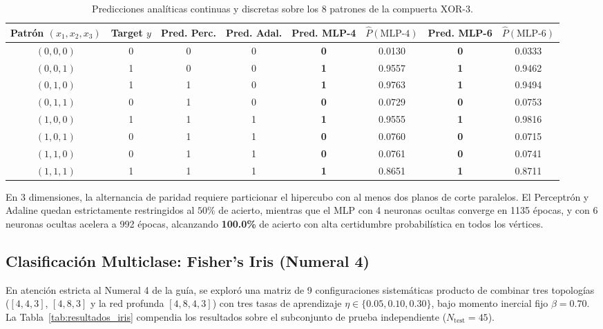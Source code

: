 \documentclass[11pt,letterpaper]{article}
\begin{document}
\begin{table}[htbp]
\centering
\small
\caption{Predicciones analíticas continuas y discretas sobre los 8 patrones de la compuerta $\text{XOR-3}$.}
\label{tab:pred_xor3}
\begin{adjustbox}{max width=\textwidth}
\begin{tabular}{c c c c c c c c}
\toprule
\textbf{Patrón $(x_1, x_2, x_3)$} & \textbf{Target $y$} & \textbf{Pred. Perc.} & \textbf{Pred. Adal.} & \textbf{Pred. MLP-4} & $\hat{P}(\text{MLP-4})$ & \textbf{Pred. MLP-6} & $\hat{P}(\text{MLP-6})$ \\
\midrule
$(0, 0, 0)$ & 0 & 0 & 0 & \textbf{0} & 0.0130 & \textbf{0} & 0.0333 \\
$(0, 0, 1)$ & 1 & 0 & 0 & \textbf{1} & 0.9557 & \textbf{1} & 0.9462 \\
$(0, 1, 0)$ & 1 & 1 & 0 & \textbf{1} & 0.9763 & \textbf{1} & 0.9494 \\
$(0, 1, 1)$ & 0 & 1 & 0 & \textbf{0} & 0.0729 & \textbf{0} & 0.0753 \\
$(1, 0, 0)$ & 1 & 1 & 1 & \textbf{1} & 0.9555 & \textbf{1} & 0.9816 \\
$(1, 0, 1)$ & 0 & 1 & 1 & \textbf{0} & 0.0760 & \textbf{0} & 0.0715 \\
$(1, 1, 0)$ & 0 & 1 & 1 & \textbf{0} & 0.0761 & \textbf{0} & 0.0741 \\
$(1, 1, 1)$ & 1 & 1 & 1 & \textbf{1} & 0.8651 & \textbf{1} & 0.8711 \\
\bottomrule
\end{tabular}
\end{adjustbox}
\end{table}

En 3 dimensiones, la alternancia de paridad requiere particionar el hipercubo con al menos dos planos de corte paralelos. El Perceptrón y Adaline quedan estrictamente restringidos al $50\%$ de acierto, mientras que el MLP con 4 neuronas ocultas converge en 1135 épocas, y con 6 neuronas ocultas acelera a 992 épocas, alcanzando \textbf{100.0\%} de acierto con alta certidumbre probabilística en todos los vértices.

\subsection{Clasificación Multiclase: Fisher's Iris (Numeral 4)}

En atención estricta al Numeral 4 de la guía, se exploró una matriz de 9 configuraciones sistemáticas producto de combinar tres topologías ($[4, 4, 3]$, $[4, 8, 3]$ y la red profunda $[4, 8, 4, 3]$) con tres tasas de aprendizaje $\eta \in \{0.05, 0.10, 0.30\}$, bajo momento inercial fijo $\beta = 0.70$. La Tabla~\ref{tab:resultados_iris} compendia los resultados sobre el subconjunto de prueba independiente ($N_{\text{test}} = 45$).
\end{document}
